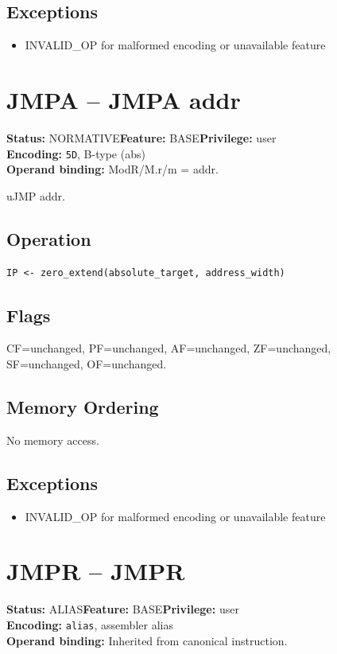 \documentclass[10pt]{article}
\begin{document}
\subsection*{Exceptions}
\begin{itemize}
\item INVALID\_OP for malformed encoding or unavailable feature
\end{itemize}
\clearpage

\section{JMPA -- JMPA addr}
\textbf{Status:} NORMATIVE\quad \textbf{Feature:} BASE\quad \textbf{Privilege:} user\\
\textbf{Encoding:} \texttt{5D}, B-type (abs)\\
\textbf{Operand binding:} ModR/M.r/m = addr.

uJMP addr.

\subsection*{Operation}
\begin{lstlisting}
IP <- zero_extend(absolute_target, address_width)
\end{lstlisting}
\subsection*{Flags}
CF=unchanged, PF=unchanged, AF=unchanged, ZF=unchanged, SF=unchanged, OF=unchanged.
\subsection*{Memory Ordering}
No memory access.
\subsection*{Exceptions}
\begin{itemize}
\item INVALID\_OP for malformed encoding or unavailable feature
\end{itemize}
\clearpage

\section{JMPR -- JMPR}
\textbf{Status:} ALIAS\quad \textbf{Feature:} BASE\quad \textbf{Privilege:} user\\
\textbf{Encoding:} \texttt{alias}, assembler alias\\
\textbf{Operand binding:} Inherited from canonical instruction.
\end{document}
